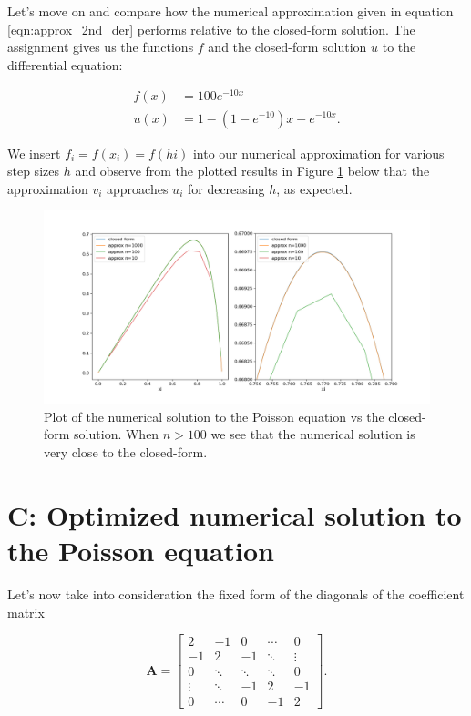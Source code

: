 \documentclass[]{article}
\begin{document}
Let's move on and compare how the numerical approximation given in equation \ref{eqn:approx_2nd_der} performs relative to the closed-form solution. The assignment gives us the functions $f$ and the closed-form solution $u$ to the differential equation:

\begin{align*}
f(x) &= 100e^{-10x} \\
u(x) &= 1 - (1 - e^{-10})x - e^{-10x}.
\end{align*}

We insert $f_i = f(x_i) = f(hi)$ into our numerical approximation for various step sizes $h$ and observe from the plotted results in Figure \ref{fig:calc-results} below that the approximation $v_i$ approaches $u_i$ for decreasing $h$, as expected.

\begin{figure}[h]
	\includegraphics[width=1.2\linewidth]{calc-results.png}
	\caption{Plot of the numerical solution to the Poisson equation vs the closed-form solution. When $n > 100$ we see that the numerical solution is very close to the closed-form.}
	\label{fig:calc-results}
\end{figure}

\section*{C: Optimized numerical solution to the Poisson equation}
Let's now take into consideration the fixed form of the diagonals of the coefficient matrix

\begin{equation*}
\mathbf{A} = 
\left[ \begin{matrix}
2 & -1 & 0 & \cdots & 0 \\
-1 & 2 & -1 & \ddots & \vdots \\
0 & \ddots & \ddots & \ddots & 0\\
\vdots & \ddots & -1 & 2 & -1 \\
0 & \cdots & 0 & -1 & 2
\end{matrix} \right]\text{.}
\end{equation*}
\end{document}
